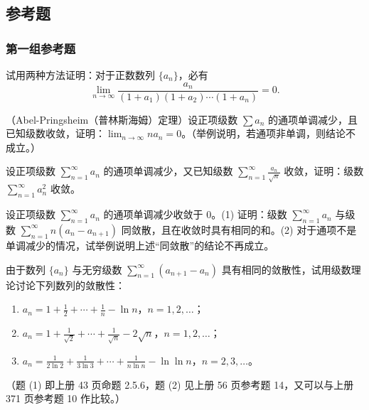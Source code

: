 \subsection{参考题}

\subsubsection*{第一组参考题}

\begin{xreferenceproblem}[1]
试用两种方法证明：对于正数数列 $\{a_n\}$，必有
\[
\lim_{n\to\infty}\frac{a_n}{(1+a_1)(1+a_2)\cdots(1+a_n)}=0.
\]
\end{xreferenceproblem}

\begin{xreferenceproblem}[2]
（Abel-Pringsheim（普林斯海姆）定理）设正项级数 $\sum a_n$ 的通项单调减少，且已知级数收敛，证明：$\lim_{n\to\infty}na_n=0$。（举例说明，若通项非单调，则结论不成立。）
\end{xreferenceproblem}

\begin{xreferenceproblem}[3]
设正项级数 $\sum_{n=1}^{\infty}a_n$ 的通项单调减少，又已知级数 $\sum_{n=1}^{\infty}\frac{a_n}{\sqrt n}$ 收敛，证明：级数 $\sum_{n=1}^{\infty}a_n^2$ 收敛。
\end{xreferenceproblem}

\begin{xreferenceproblem}[4]
设正项级数 $\sum_{n=1}^{\infty}a_n$ 的通项单调减少收敛于 0。(1) 证明：级数 $\sum_{n=1}^{\infty}a_n$ 与级数 $\sum_{n=1}^{\infty}n(a_n-a_{n+1})$ 同敛散，且在收敛时具有相同的和。(2) 对于通项不是单调减少的情况，试举例说明上述“同敛散”的结论不再成立。
\end{xreferenceproblem}

\begin{xreferenceproblem}[5]
由于数列 $\{a_n\}$ 与无穷级数 $\sum_{n=1}^{\infty}(a_{n+1}-a_n)$ 具有相同的敛散性，试用级数理论讨论下列数列的敛散性：
\begin{enumerate}[label=(\arabic*)]
\item $a_n=1+\frac12+\cdots+\frac1n-\ln n$，$n=1,2,\ldots$；
\item $a_n=1+\frac1{\sqrt2}+\cdots+\frac1{\sqrt n}-2\sqrt n$，$n=1,2,\ldots$；
\item $a_n=\frac1{2\ln2}+\frac1{3\ln3}+\cdots+\frac1{n\ln n}-\ln\ln n$，$n=2,3,\ldots$。
\end{enumerate}
（题 (1) 即上册 43 页命题 2.5.6，题 (2) 见上册 56 页参考题 14，又可以与上册 371 页参考题 10 作比较。）
\end{xreferenceproblem}

